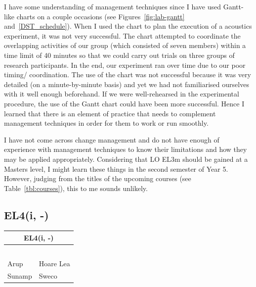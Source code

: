 I have some understanding of management techniques since I have used Gantt-like charts on a couple occasions (see Figures~\ref{fig:lab-gantt} and~\ref{DST_schedule}).
When I used the chart to plan the execution of a \LABTitle \space acoustics experiment, it was not very successful.
The chart attempted to coordinate the overlapping activities of our group (which consisted of seven members) within a time limit of 40 minutes so that we could carry out trials on three groups of research participants.
In the end, our experiment ran over time due to our poor timing/ coordination.
The use of the chart was not successful because it was very detailed (on a minute-by-minute basis) and yet we had not familiarised ourselves with it well enough beforehand.
If we were well-rehearsed in the experimental procedure, the use of the Gantt chart could have been more successful.
Hence I learned that there is an element of practice that needs to complement management techniques in order for them to work or run smoothly.

I have not come across change management and do not have enough of experience with management techniques to know their limitations and how they may be applied appropriately.
Considering that LO EL3m should be gained at a Masters level, I might learn these things in the second semester of Year 5.
However, judging from the titles of the upcoming courses (see Table~\ref{tbl:courses}), this to me sounds unlikely.





\subsection*{EL4(i, -)}

\begin{table}
	\begin{tabular}{|ll|}
		\hline
		\multicolumn{2}{|c|}{\cellcolor[HTML]{F8A102}\textbf{EL4(i, -)}} \\ \hline
		\IE & \DPA \\
		\CAS & \EnBldgs \\
		\DI & \FMP \\
		\SIB & \CCSA \\
		\WSD &  \\
		Arup & Hoare Lea \\
		Sunamp & Sweco \\ \hline
	\end{tabular}
\end{table}

